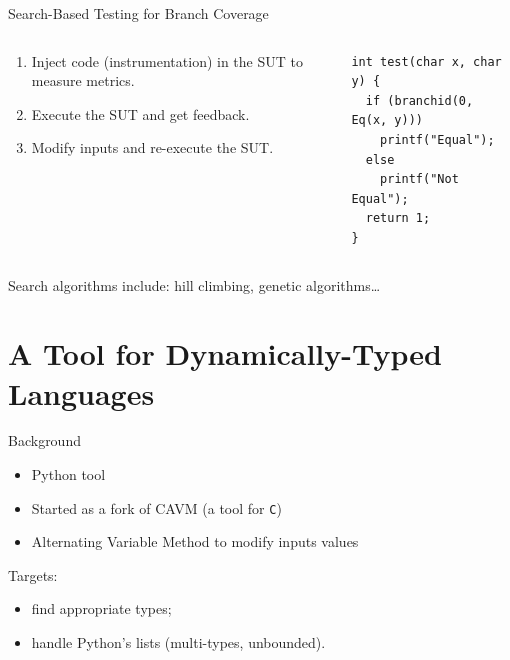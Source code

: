 \documentclass{beamer}
\begin{document}
\begin{frame}[fragile]{Search-Based Testing for Branch Coverage}
  \begin{columns}
    \begin{column}{0.5\textwidth}
      \begin{enumerate}
        \item Inject code (instrumentation) in the SUT to measure metrics.
        \item Execute the SUT and get feedback.
        \item Modify inputs and re-execute the SUT.
      \end{enumerate}
    \end{column}
    \begin{column}{0.5\textwidth}
      \begin{verbatim}
int test(char x, char y) {
  if (branchid(0, Eq(x, y)))
    printf("Equal");
  else
    printf("Not Equal");
  return 1;
}
      \end{verbatim}
    \end{column}
  \end{columns}

  \vfill

  Search algorithms include: hill climbing, genetic algorithms\dots
\end{frame}


\section{A Tool for Dynamically-Typed Languages}

\begin{frame}{Background}
  \begin{itemize}
    \item Python tool
    \item Started as a fork of CAVM (a tool for \texttt{C})
    \item Alternating Variable Method to modify inputs values
  \end{itemize}

  Targets:
  \begin{itemize}
    \item find appropriate types;
    \item handle Python's lists (multi-types, unbounded).
  \end{itemize}
\end{frame}
\end{document}
